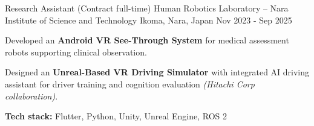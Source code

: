 \begin{cventries}
  \cventry
    {Research Assistant (Contract full-time)}
    {Human Robotics Laboratory – Nara Institute of Science and Technology}
    {Ikoma, Nara, Japan}
    {Nov 2023 - Sep 2025}
    {
      \begin{cvitems}
        \item {Developed an \textbf{Android VR See-Through System} for medical assessment robots supporting clinical observation.}
        \item {Designed an \textbf{Unreal-Based VR Driving Simulator} with integrated AI driving assistant for driver training and cognition evaluation \textit{(Hitachi Corp collaboration)}.}
        \item {\textbf{Tech stack:} Flutter, Python, Unity, Unreal Engine, ROS 2}
      \end{cvitems}
    }



\end{cventries}
